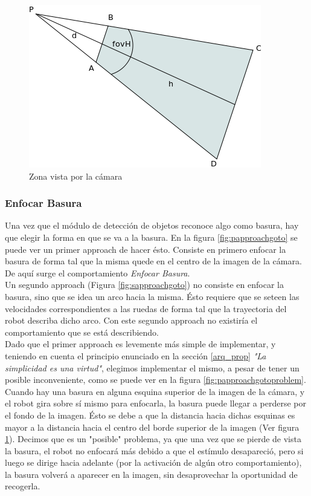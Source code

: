 \begin{figure}[htp]
\begin{center}
\includegraphics[scale=0.5]{comportamientos/rectangleWander.png}
\caption{Zona vista por la c\'amara}
\label{fig:zoneCamera}
\end{center}
\end{figure}

\subsubsection{Enfocar Basura}
\label{focus_garbage}
Una vez que el m\'odulo de detecci\'on de objetos reconoce algo como basura, hay que elegir
la forma en que se va a la basura. En la figura \ref{fig:papproachgoto} se puede ver un
primer approach de hacer \'esto. Consiste en primero enfocar la basura de forma tal que
la misma quede en el centro de la imagen de la c\'amara. De aqu\'i surge el comportamiento
\emph{Enfocar Basura}.
\\
Un segundo approach (Figura \ref{fig:sapproachgoto}) no consiste en enfocar la basura,
sino que se idea un arco hacia la misma. \'Esto requiere que se seteen las velocidades
correspondientes a las ruedas de forma tal que la trayectoria del robot describa dicho
arco. Con este segundo approach no existir\'ia el comportamiento que se est\'a describiendo.
\\
Dado que el primer approach es levemente m\'as simple de implementar, y teniendo en cuenta el
principio enunciado en la secci\'on \ref{arq_prop} \emph{"La simplicidad es una virtud"},
elegimos implementar el mismo, a pesar de tener un posible inconveniente, como se puede
ver en la figura \ref{fig:papproachgotoproblem}.
\\
Cuando hay una basura en alguna esquina
superior de la imagen de la c\'amara, y el robot gira sobre s\'i mismo para enfocarla,
la basura puede llegar a perderse por el fondo de la imagen. \'Esto se debe a que la distancia
hacia dichas esquinas es mayor a la distancia hacia el centro del borde superior de la imagen
(Ver figura \ref{fig:zoneCamera}). Decimos que es un "posible" problema, ya que una vez que se
pierde de vista la basura, el robot no enfocar\'a m\'as debido a que el est\'imulo desapareci\'o,
pero si luego se dirige hacia adelante (por la activaci\'on de alg\'un otro comportamiento), 
la basura volver\'a a aparecer en la imagen, sin desaprovechar la oportunidad de recogerla.

